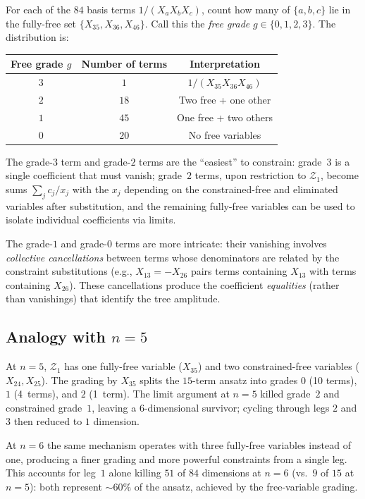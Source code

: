 \documentclass[11pt]{article}
\theoremstyle{plain}
\theoremstyle{definition}
\newcommand{\cZ}{\mathcal{Z}}
\begin{document}
For each of the $84$ basis terms $1/(X_a X_b X_c)$, count how many of $\{a, b, c\}$
lie in the fully-free set $\{X_{35}, X_{36}, X_{46}\}$. Call this the \emph{free grade}
$g \in \{0, 1, 2, 3\}$. The distribution is:

\begin{center}
\begin{tabular}{ccc}
\toprule
Free grade $g$ & Number of terms & Interpretation \\
\midrule
$3$ & $1$  & $1/(X_{35} X_{36} X_{46})$ \\
$2$ & $18$ & Two free + one other \\
$1$ & $45$ & One free + two others \\
$0$ & $20$ & No free variables \\
\bottomrule
\end{tabular}
\end{center}

The grade-$3$ term and grade-$2$ terms are the ``easiest'' to constrain: grade~$3$
is a single coefficient that must vanish; grade~$2$ terms, upon restriction to
$\cZ_1$, become sums $\sum_j c_j / x_j$ with the $x_j$ depending on the
constrained-free and eliminated variables after substitution, and the remaining
fully-free variables can be used to isolate individual coefficients via limits.

The grade-$1$ and grade-$0$ terms are more intricate: their vanishing involves
\emph{collective cancellations} between terms whose denominators are related by the
constraint substitutions (e.g., $X_{13} = -X_{26}$ pairs terms containing $X_{13}$
with terms containing $X_{26}$). These cancellations produce the coefficient
\emph{equalities} (rather than vanishings) that identify the tree amplitude.

\subsection{Analogy with $n=5$}

At $n=5$, $\cZ_1$ has one fully-free variable ($X_{35}$) and two constrained-free
variables ($X_{24}, X_{25}$). The grading by $X_{35}$ splits the $15$-term ansatz
into grades $0$ (10 terms), $1$ (4~terms), and $2$ (1~term). The limit argument
at $n=5$ killed grade~$2$ and constrained grade~$1$, leaving a $6$-dimensional
survivor; cycling through legs $2$ and $3$ then reduced to $1$ dimension.

At $n=6$ the same mechanism operates with three fully-free variables instead of one,
producing a finer grading and more powerful constraints from a single leg. This
accounts for leg~$1$ alone killing $51$ of $84$ dimensions at $n=6$ (vs.\ $9$ of
$15$ at $n=5$): both represent $\sim 60\%$ of the ansatz, achieved by the
free-variable grading.
\end{document}
